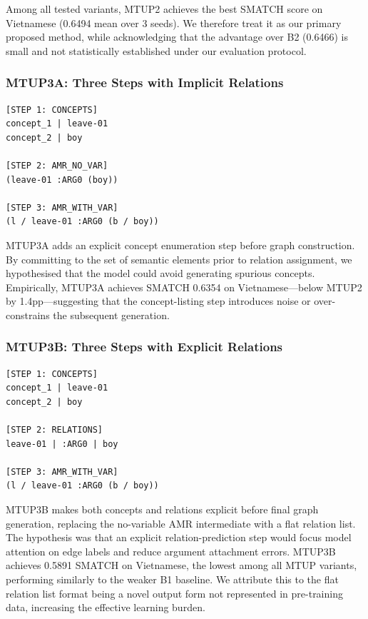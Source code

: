 Among all tested variants, MTUP2 achieves the best SMATCH score on Vietnamese
(0.6494 mean over 3 seeds). We therefore treat it as our primary proposed
method, while acknowledging that the advantage over B2 (0.6466) is small and
not statistically established under our evaluation protocol.

\subsubsection{MTUP3A: Three Steps with Implicit Relations}

\begin{lstlisting}[style=amrstyle, basicstyle=\scriptsize\ttfamily]
[STEP 1: CONCEPTS]
concept_1 | leave-01
concept_2 | boy

[STEP 2: AMR_NO_VAR]
(leave-01 :ARG0 (boy))

[STEP 3: AMR_WITH_VAR]
(l / leave-01 :ARG0 (b / boy))
\end{lstlisting}

MTUP3A adds an explicit concept enumeration step before graph construction.
By committing to the set of semantic elements prior to relation assignment, we
hypothesised that the model could avoid generating spurious concepts. Empirically,
MTUP3A achieves SMATCH 0.6354 on Vietnamese---below MTUP2 by 1.4pp---suggesting
that the concept-listing step introduces noise or over-constrains the subsequent
generation.

\subsubsection{MTUP3B: Three Steps with Explicit Relations}

\begin{lstlisting}[style=amrstyle, basicstyle=\scriptsize\ttfamily]
[STEP 1: CONCEPTS]
concept_1 | leave-01
concept_2 | boy

[STEP 2: RELATIONS]
leave-01 | :ARG0 | boy

[STEP 3: AMR_WITH_VAR]
(l / leave-01 :ARG0 (b / boy))
\end{lstlisting}

MTUP3B makes both concepts and relations explicit before final graph
generation, replacing the no-variable AMR intermediate with a flat relation
list. The hypothesis was that an explicit relation-prediction step would focus
model attention on edge labels and reduce argument attachment errors.
MTUP3B achieves 0.5891 SMATCH on Vietnamese, the lowest among all MTUP
variants, performing similarly to the weaker B1 baseline. We attribute this to
the flat relation list format being a novel output form not represented in
pre-training data, increasing the effective learning burden.

